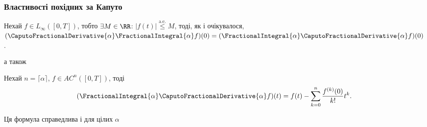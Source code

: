 \subsubsection{Властивості похідних за Капуто}
\begin{theorem}
    Нехай $f \in L_\infty([0,T])$, тобто $\exists M \in \RR$: $|f(t)| \overset{\text{a.e.}}{\le} M$, тоді, як і очікувалося, $(\CaputoFractionalDerivative{\alpha} \FractionalIntegral{\alpha} f)(0) = (\FractionalIntegral{\alpha} \CaputoFractionalDerivative{\alpha} f)(0)$.
\end{theorem}
а також
\begin{theorem}
    Нехай $n = \lceil \alpha \rceil$, $f \in AC^n([0,T])$, тоді
    \begin{equation}
        (\FractionalIntegral{\alpha} \CaputoFractionalDerivative{\alpha} f)(t) = f(t) - \sum_{k = 0}^n \frac{f^{(k)}(0)}{k!} t^k.
    \end{equation}
\end{theorem}
\begin{remark}
    Ця формула справедлива і для цілих $\alpha$
\end{remark}

